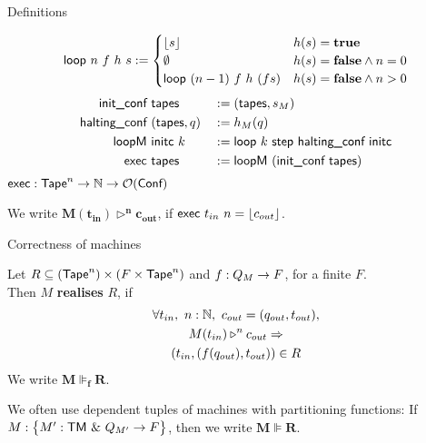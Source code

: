 \begin{frame}{Definitions}
  \begin{definition}[Execution]
    \begin{align*}
      \textsf{loop}~n~f~h~s :=
      \begin{cases}
        \left\lfloor {s}\right\rfloor              & h(s) = \mathbf{true} \\
        \emptyset                 & h(s) = \mathbf{false} \land n = 0 \\
        \textsf{loop}~(n-1)~f~h~(f s)  & h(s) = \mathbf{false} \land n > 0
      \end{cases}
    \end{align*}
    \pause%
    \begin{alignat*}{3}
      \textsf{init\_conf}    &~\textsf{tapes}      &&:= (\textsf{tapes}, s_M) \\
      \textsf{halting\_conf} &~(\textsf{tapes}, q) &&:= h_M(q) \\
      \textsf{loopM}         &~\textsf{initc}~k    &&:= \textsf{loop}~k~\textsf{step}~\textsf{halting\_conf}~\textsf{initc} \\
      \textsf{exec}          &~\textsf{tapes}      &&:= \textsf{loopM}~(\textsf{init\_conf}~\textsf{tapes})
    \end{alignat*}
    {
      \small
      $\textsf{exec} : \textsf{Tape}^n \rightarrow \mathbb{N} \rightarrow \mathcal{O}(\textsf{Conf})$
    }
  \end{definition}

  \pause%
  We write $\mathbf{M(t_{in}) \triangleright^n c_{out}}$, if $\textsf{exec}~t_{in}~n= \left\lfloor {c_{out}}\right\rfloor$.
\end{frame}

\begin{frame}{Correctness of machines}
  \begin{definition}
    Let $R \subseteq (\textsf{Tape}^n) \times (F \times \textsf{Tape}^n)$ and $f : Q_M \rightarrow F$, for a finite $F$.\\
    Then $M$ \textbf{realises} $R$, if
    \begin{multline*}
      \forall t_{in},~n:\mathbb{N},~c_{out}=(q_{out}, t_{out}), \\
      M(t_{in}) \triangleright^n c_{out} \Rightarrow \\
      \left(t_{in}, \left(f(q_{out}), t_{out} \right) \right) \in R
    \end{multline*}
    We write $\mathbf{M \VDash_f R}$.
  \end{definition}
  \pause%
  We often use dependent tuples of machines with partitioning functions:
  If $M : \bigl\{ M' : \textsf{TM}~{\&}~Q_{M'} \rightarrow F \bigr \}$, then we write $\mathbf{M \VDash R}$.
\end{frame}

